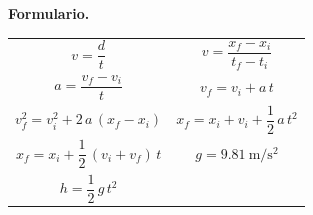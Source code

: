 \documentclass[12pt, letter]{exam}
\begin{document}
\newpage
\textbf{\huge{Formulario.}}
\begin{table}[H]
    \centering
    \setlength{\tabcolsep}{40pt}
    \renewcommand{\arraystretch}{2.5}
    \begin{tabular}{c  c}
            $v = \dfrac{d}{t}$ & $v = \dfrac{x_{f} - x_{i}}{t_{f} - t_{i}}$ \\
		    $a = \dfrac{v_{f} - v_{i}}{t}$ & $v_{f} = v_{i} + a \, t$ \\
            $v_{f}^{2} = v_{i}^{2} + 2 \, a \, \left(x_{f} - x_{i} \right)$ & $x_{f} = x_{i} + v_{i} + \dfrac{1}{2} \, a \, t^{2}$ \\
            $x_{f} = x_{i} + \dfrac{1}{2} \, \left(v_{i} + v_{f} \right) \, t$ & $g = \SI{9.81}{\meter\per\square\second}$ \\
            $h =\dfrac{1}{2} \,g \, t^{2}$ & \\
\end{tabular}
\end{table}
\end{document}
